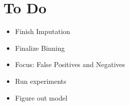 \section{To Do}

\begin{itemize}
	\item Finish Imputation
	\item Finalize Binning
	\item Focus:  False Positives and Negatives
	\item Run experiments
	\item Figure out model
\end{itemize}